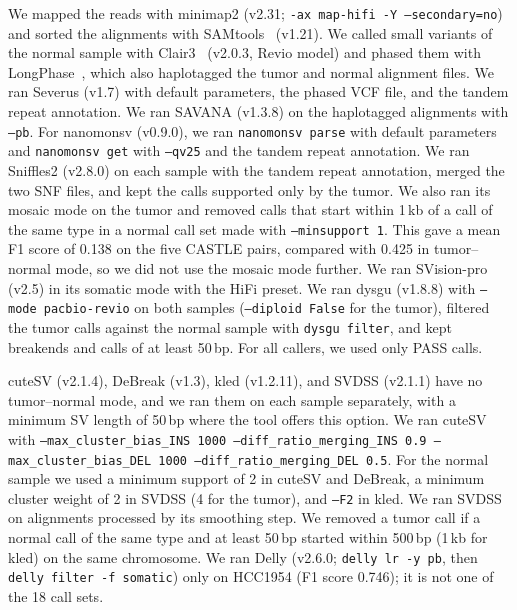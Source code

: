 We mapped the reads with minimap2 (v2.31; \texttt{-ax map-hifi -Y --secondary=no}) and sorted the alignments with SAMtools~\cite{samtools} (v1.21).
We called small variants of the normal sample with Clair3~\cite{clair3} (v2.0.3, Revio model) and phased them with LongPhase~\cite{longphase}, which also haplotagged the tumor and normal alignment files.
We ran Severus (v1.7) with default parameters, the phased VCF file, and the tandem repeat annotation.
We ran SAVANA (v1.3.8) on the haplotagged alignments with \texttt{--pb}.
For nanomonsv (v0.9.0), we ran \texttt{nanomonsv parse} with default parameters and \texttt{nanomonsv get} with \texttt{--qv25} and the tandem repeat annotation.
We ran Sniffles2 (v2.8.0) on each sample with the tandem repeat annotation, merged the two SNF files, and kept the calls supported only by the tumor.
We also ran its mosaic mode on the tumor and removed calls that start within 1\,kb of a call of the same type in a normal call set made with \texttt{--minsupport 1}.
This gave a mean F1 score of 0.138 on the five CASTLE pairs, compared with 0.425 in tumor--normal mode, so we did not use the mosaic mode further.
We ran SVision-pro (v2.5) in its somatic mode with the HiFi preset.
We ran dysgu (v1.8.8) with \texttt{--mode pacbio-revio} on both samples (\texttt{--diploid False} for the tumor), filtered the tumor calls against the normal sample with \texttt{dysgu filter}, and kept breakends and calls of at least 50\,bp.
For all callers, we used only PASS calls.

{\sloppy cuteSV (v2.1.4), DeBreak (v1.3), kled (v1.2.11), and SVDSS (v2.1.1) have no tumor--normal mode, and we ran them on each sample separately, with a minimum SV length of 50\,bp where the tool offers this option.
We ran cuteSV with \texttt{--max\_cluster\_bias\_INS 1000 --diff\_ratio\_merging\_INS 0.9 --max\_cluster\_bias\_DEL 1000 --diff\_ratio\_merging\_DEL 0.5}.
For the normal sample we used a minimum support of 2 in cuteSV and DeBreak, a minimum cluster weight of 2 in SVDSS (4 for the tumor), and \texttt{--F2} in kled.
We ran SVDSS on alignments processed by its smoothing step.
We removed a tumor call if a normal call of the same type and at least 50\,bp started within 500\,bp (1\,kb for kled) on the same chromosome.
We ran Delly (v2.6.0; \texttt{delly lr -y pb}, then \texttt{delly filter -f somatic}) only on HCC1954 (F1 score 0.746); it is not one of the 18 call sets.\par}


